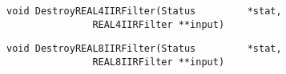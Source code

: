 \vspace{-0.1in}
\begin{verbatim}
void DestroyREAL4IIRFilter(Status         *stat,
			   REAL4IIRFilter **input)
\end{verbatim}
\vspace{-0.1in}
\begin{verbatim}
void DestroyREAL8IIRFilter(Status         *stat,
			   REAL8IIRFilter **input)
\end{verbatim}
